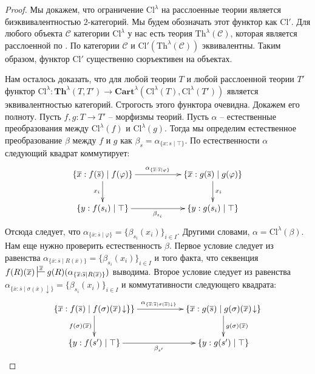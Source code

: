 \documentclass[reqno]{amsart}
\theoremstyle{definition}
\theoremstyle{remark}
\newcommand{\bcat}[1]{\mathbf{#1}}
\newcommand{\cat}[1]{\mathcal{#1}}
\renewcommand{\C}{\cat{C}}
\newcommand{\fs}[1]{\mathrm{#1}}
\newcommand{\Th}{\bcat{Th}}
\begin{document}
\begin{proof}
Мы докажем, что ограничение $\fs{Cl}^\lambda$ на расслоенные теории является биэквивалентностью $2$-категорий.
Мы будем обозначать этот функтор как $\fs{Cl}'$.
Для любого объекта $\C$ категории $\fs{Cl}^\lambda$ у нас есть теория $\fs{Th}^\lambda(\C)$, которая является расслоенной по .
По  категории $\C$ и $\fs{Cl}'(\fs{Th}^\lambda(\C))$ эквивалентны.
Таким образом, функтор $\fs{Cl}'$ существенно сюръективен на объектах.

Нам осталось доказать, что для любой теории $T$ и любой расслоенной теории $T'$ функтор $\fs{Cl}^\lambda : \Th^\lambda(T,T') \to \bcat{Cart}^\lambda(\fs{Cl}^\lambda(T), \fs{Cl}^\lambda(T'))$ является эквивалентностью категорий.
Строгость этого функтора очевидна.
Докажем его полноту.
Пусть $f,g : T \to T'$ -- морфизмы теорий.
Пусть $\alpha$ -- естественные преобразования между $\fs{Cl}^\lambda(f)$ и $\fs{Cl}^\lambda(g)$.
Тогда мы определим естественное преобразование $\beta$ между $f$ и $g$ как $\beta_s = \alpha_{\{ x : s \mid \top \}}$.
По естественности $\alpha$ следующий квадрат коммутирует:
\[ \xymatrix{ \{ \overline{x} : f(\overline{s}) \mid f(\varphi) \} \ar[rr]^{\alpha_{\{ \overline{x} : \overline{s} \mid \varphi \}}} \ar[d]_{x_i} & & \{ \overline{x} : g(\overline{s}) \mid g(\varphi) \} \ar[d]^{x_i} \\
              \{ y : f(s_i) \mid \top \} \ar[rr]_{\beta_{s_i}}                                                                                    & & \{ y : g(s_i) \mid \top \}
            } \]
Отсюда следует, что $\alpha_{\{ \overline{x} : \overline{s} \mid \varphi \}} = \{ \beta_{s_i}(x_i) \}_{i \in I}$.
Другими словами, $\alpha = \fs{Cl}^\lambda(\beta)$.
Нам еще нужно проверить естественность $\beta$.
Первое условие следует из равенства $\alpha_{\{ \overline{x} : \overline{s} \mid R(\overline{x}) \}} = \{ \beta_{s_i}(x_i) \}_{i \in I}$ и того факта, что 
секвенция $f(R)(\overline{x}) \sststile{}{\overline{x}} g(R)(\alpha_{\{ \overline{x} : \overline{s} \mid R(\overline{x}) \}})$ выводима.
Второе условие следует из равенства $\alpha_{\{ \overline{x} : \overline{s} \mid \sigma(\overline{x}) \downarrow \}} = \{ \beta_{s_i}(x_i) \}_{i \in I}$ и коммутативности следующего квадрата:
\[ \xymatrix{ \{ \overline{x} : f(\overline{s}) \mid f(\sigma)(\overline{x})\!\downarrow \} \ar[rr]^{\alpha_{\{ \overline{x} : \overline{s} \mid \sigma(\overline{x}) \downarrow \}}} \} \ar[d]_{f(\sigma)(\overline{x})} & & \{ \overline{x} : g(\overline{s}) \mid g(\sigma)(\overline{x})\!\downarrow \} \ar[d]^{g(\sigma)(\overline{x})} \\
              \{ y : f(s') \mid \top \} \ar[rr]_{\beta_{s'}}                                                                                                                                                              & & \{ y : g(s') \mid \top \}
            } \]


\end{proof}
\end{document}
